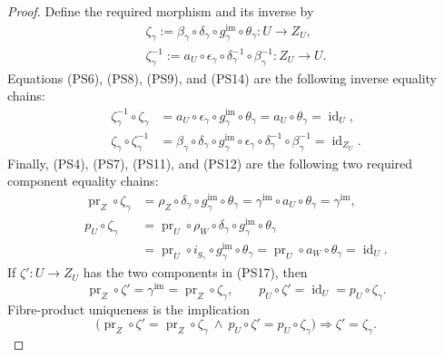 \begin{proof}
  Define the required morphism and its inverse by
  \[
  \begin{gathered}
    \zeta_\gamma:=\beta_\gamma\circ\delta_\gamma
      \circ g_\gamma^{\mathrm{im}}\circ\theta_\gamma
      \colon U\to Z_U,\\
    \zeta_\gamma^{-1}:=a_U\circ\epsilon_\gamma
      \circ\delta_\gamma^{-1}\circ\beta_\gamma^{-1}
      \colon Z_U\to U.                                         
  \end{gathered} \tag{PS15}
  \]
  Equations (PS6), (PS8), (PS9), and (PS14) are the following inverse
  equality chains:
  \[
  \begin{aligned}
    \zeta_\gamma^{-1}\circ\zeta_\gamma
      &=a_U\circ\epsilon_\gamma\circ g_\gamma^{\mathrm{im}}
          \circ\theta_\gamma
       =a_U\circ\theta_\gamma=\operatorname{id}_U,\\
    \zeta_\gamma\circ\zeta_\gamma^{-1}
      &=\beta_\gamma\circ\delta_\gamma
          \circ g_\gamma^{\mathrm{im}}\circ\epsilon_\gamma
          \circ\delta_\gamma^{-1}\circ\beta_\gamma^{-1}
       =\operatorname{id}_{Z_U}.
  \end{aligned}                                                  \tag{PS16}
  \]
  Finally, (PS4), (PS7), (PS11), and (PS12) are the following two required
  component equality chains:
  \[
  \begin{aligned}
    \operatorname{pr}_Z\circ\zeta_\gamma
      &=\rho_Z\circ\delta_\gamma\circ g_\gamma^{\mathrm{im}}
          \circ\theta_\gamma
       =\gamma^{\mathrm{im}}\circ a_U\circ\theta_\gamma
       =\gamma^{\mathrm{im}},\\
    p_U\circ\zeta_\gamma
      &=\operatorname{pr}_U\circ\rho_W\circ\delta_\gamma
          \circ g_\gamma^{\mathrm{im}}\circ\theta_\gamma\\
      &=\operatorname{pr}_U\circ i_{g_\gamma}
          \circ g_\gamma^{\mathrm{im}}\circ\theta_\gamma
       =\operatorname{pr}_U\circ a_W\circ\theta_\gamma
       =\operatorname{id}_U.
  \end{aligned}                                                  \tag{PS17}
  \]
  If $\zeta'\colon U\to Z_U$ has the two components in (PS17), then
  \[
    \operatorname{pr}_Z\circ\zeta'
      =\gamma^{\mathrm{im}}
      =\operatorname{pr}_Z\circ\zeta_\gamma,
    \qquad
    p_U\circ\zeta'
      =\operatorname{id}_U
      =p_U\circ\zeta_\gamma.
  \]
  Fibre-product uniqueness is the implication
  \[
    \bigl(
      \operatorname{pr}_Z\circ\zeta'
        =\operatorname{pr}_Z\circ\zeta_\gamma
      \ \wedge\
      p_U\circ\zeta'=p_U\circ\zeta_\gamma
    \bigr)
      \Longrightarrow \zeta'=\zeta_\gamma.
  \]
\end{proof}


